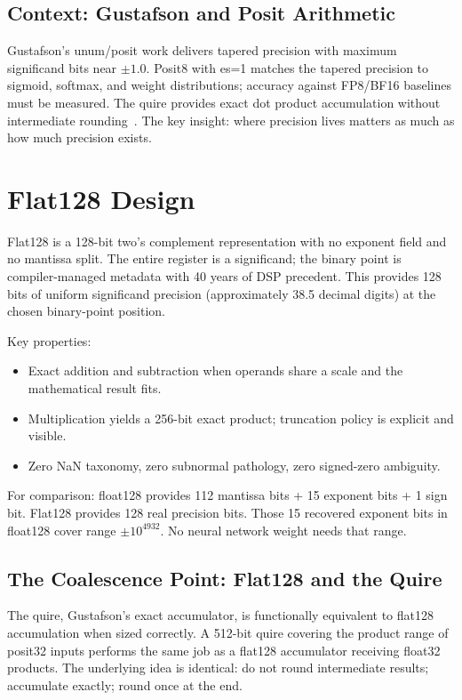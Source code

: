\documentclass[runningheads]{llncs}
\begin{document}
\subsection{Context: Gustafson and Posit Arithmetic}

Gustafson's unum/posit work delivers tapered precision with maximum
significand bits near $\pm1.0$. Posit8 with es=1 matches the tapered
precision to sigmoid, softmax, and weight distributions; accuracy against FP8/BF16 baselines must be measured. The quire provides exact
dot product accumulation without intermediate rounding~\cite{posits-standard-2022}. The key insight: where precision lives matters as much as how much precision exists.

\section{Flat128 Design}\label{sec:design}

Flat128 is a 128-bit two's complement representation with no exponent
field and no mantissa split. The entire register is a significand; the
binary point is compiler-managed metadata with 40 years of DSP precedent.
This provides 128 bits of uniform significand precision (approximately
38.5 decimal digits) at the chosen binary-point position.

\medskip
\noindent Key properties:
\begin{itemize}
  \setlength{\itemsep}{6pt}
  \setlength{\topsep}{2pt}
  \item Exact addition and subtraction
  when operands share a scale and the
  mathematical result fits.
  \item Multiplication yields a 256-bit
  exact product; truncation policy is
  explicit and visible.
  \item Zero NaN taxonomy, zero subnormal
  pathology, zero signed-zero ambiguity.
\end{itemize}

For comparison: float128 provides 112 mantissa bits + 15 exponent bits +
1 sign bit. Flat128 provides 128 real precision bits. Those 15 recovered
exponent bits in float128 cover range $\pm10^{4932}$. No neural network
weight needs that range.

\subsection{The Coalescence Point: Flat128 and the Quire}

The quire, Gustafson's exact accumulator, is functionally
equivalent to flat128 accumulation when sized correctly. A 512-bit quire
covering the product range of posit32 inputs performs the same job as a
flat128 accumulator receiving float32 products. The underlying idea is
identical: do not round intermediate results; accumulate exactly; round
once at the end.
\end{document}
